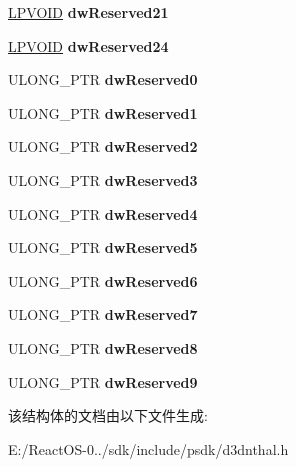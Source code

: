 \begin{DoxyCompactItemize}
\hyperlink{interfacevoid}{L\+P\+V\+O\+ID} {\bfseries dw\+Reserved21}
\item 
\mbox{\label{struct___d3_d_n_t_h_a_l___c_a_l_l_b_a_c_k_s_a537f4e3e049f8d5cb3e03425546445dc}} 
\hyperlink{interfacevoid}{L\+P\+V\+O\+ID} {\bfseries dw\+Reserved24}
\item 
\mbox{\label{struct___d3_d_n_t_h_a_l___c_a_l_l_b_a_c_k_s_a87329e6819dfacd666fefe3b66d2835f}} 
U\+L\+O\+N\+G\+\_\+\+P\+TR {\bfseries dw\+Reserved0}
\item 
\mbox{\label{struct___d3_d_n_t_h_a_l___c_a_l_l_b_a_c_k_s_aa850c59242962a3a79daa397376f77a8}} 
U\+L\+O\+N\+G\+\_\+\+P\+TR {\bfseries dw\+Reserved1}
\item 
\mbox{\label{struct___d3_d_n_t_h_a_l___c_a_l_l_b_a_c_k_s_a69cf57abccb3f80ff201893a58073b4a}} 
U\+L\+O\+N\+G\+\_\+\+P\+TR {\bfseries dw\+Reserved2}
\item 
\mbox{\label{struct___d3_d_n_t_h_a_l___c_a_l_l_b_a_c_k_s_afc1f18ee7f3ab28b2695b0c99441633a}} 
U\+L\+O\+N\+G\+\_\+\+P\+TR {\bfseries dw\+Reserved3}
\item 
\mbox{\label{struct___d3_d_n_t_h_a_l___c_a_l_l_b_a_c_k_s_aaebc40cd68a2602d1e41a070f55edeeb}} 
U\+L\+O\+N\+G\+\_\+\+P\+TR {\bfseries dw\+Reserved4}
\item 
\mbox{\label{struct___d3_d_n_t_h_a_l___c_a_l_l_b_a_c_k_s_a10ee56dd8f34448bc351d1648200c095}} 
U\+L\+O\+N\+G\+\_\+\+P\+TR {\bfseries dw\+Reserved5}
\item 
\mbox{\label{struct___d3_d_n_t_h_a_l___c_a_l_l_b_a_c_k_s_a702f5a622cfb89efb239f5381b4fb1da}} 
U\+L\+O\+N\+G\+\_\+\+P\+TR {\bfseries dw\+Reserved6}
\item 
\mbox{\label{struct___d3_d_n_t_h_a_l___c_a_l_l_b_a_c_k_s_a4bc0be968a65e140f8822be9c1b55331}} 
U\+L\+O\+N\+G\+\_\+\+P\+TR {\bfseries dw\+Reserved7}
\item 
\mbox{\label{struct___d3_d_n_t_h_a_l___c_a_l_l_b_a_c_k_s_a528efd597c9206f845a298051f6cc093}} 
U\+L\+O\+N\+G\+\_\+\+P\+TR {\bfseries dw\+Reserved8}
\item 
\mbox{\label{struct___d3_d_n_t_h_a_l___c_a_l_l_b_a_c_k_s_ab5425c907e1d091131afe635d21c8858}} 
U\+L\+O\+N\+G\+\_\+\+P\+TR {\bfseries dw\+Reserved9}
\end{DoxyCompactItemize}


该结构体的文档由以下文件生成\+:\begin{DoxyCompactItemize}
\item 
E\+:/\+React\+O\+S-\/0../sdk/include/psdk/d3dnthal.\+h\end{DoxyCompactItemize}
